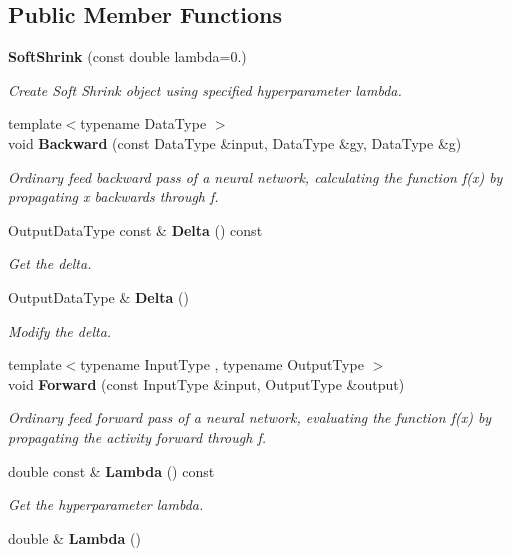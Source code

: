 \subsection*{Public Member Functions}
\begin{DoxyCompactItemize}
\item 
\textbf{ Soft\+Shrink} (const double lambda=0.)
\begin{DoxyCompactList}\small\item\em Create Soft Shrink object using specified hyperparameter lambda. \end{DoxyCompactList}\item 
{\footnotesize template$<$typename Data\+Type $>$ }\\void \textbf{ Backward} (const Data\+Type \&input, Data\+Type \&gy, Data\+Type \&g)
\begin{DoxyCompactList}\small\item\em Ordinary feed backward pass of a neural network, calculating the function f(x) by propagating x backwards through f. \end{DoxyCompactList}\item 
Output\+Data\+Type const  \& \textbf{ Delta} () const
\begin{DoxyCompactList}\small\item\em Get the delta. \end{DoxyCompactList}\item 
Output\+Data\+Type \& \textbf{ Delta} ()
\begin{DoxyCompactList}\small\item\em Modify the delta. \end{DoxyCompactList}\item 
{\footnotesize template$<$typename Input\+Type , typename Output\+Type $>$ }\\void \textbf{ Forward} (const Input\+Type \&input, Output\+Type \&output)
\begin{DoxyCompactList}\small\item\em Ordinary feed forward pass of a neural network, evaluating the function f(x) by propagating the activity forward through f. \end{DoxyCompactList}\item 
double const  \& \textbf{ Lambda} () const
\begin{DoxyCompactList}\small\item\em Get the hyperparameter lambda. \end{DoxyCompactList}\item 
double \& \textbf{ Lambda} ()

\end{DoxyCompactItemize}
